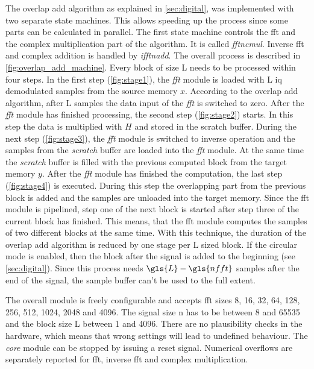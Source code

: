 \documentclass[12pt,a4paper,parskip=full,abstract=true,BCOR=12mm,twoside,open=right]{scrreprt}
\def\device#1{\mbox{\textit{#1}}}
\begin{document}
The overlap add algorithm as explained in \cref{sec:digital}, was implemented with
two separate state machines. This allows speeding up the process since some parts can be calculated in parallel.
The first state machine controls the \gls{fft} and the complex multiplication part of the
algorithm. It is called \device{fftncmul}. Inverse \gls{fft} and complex
addition is handled by \device{ifftnadd}. The overall process is described in
\cref{fig:overlap_add_machine}. Every block of size \gls{L}
needs to be processed within four steps. In the first step (\cref{fig:stage1}),
the \device{fft} module is loaded with \gls{L} \gls{iq} demodulated samples from the source memory $x$. According to
the overlap add algorithm, after \gls{L} samples the data input of the \device{fft}
is switched to zero. After the \device{fft} module has finished processing,
the second step (\cref{fig:stage2}) starts. In this step the data is multiplied
with $H$ and stored in the scratch buffer. During the next step (\cref{fig:stage3}),
the \device{fft} module is switched to inverse operation and the samples from the
\device{scratch} buffer are loaded into the \device{fft} module. At the same time
the \device{scratch} buffer is filled with the previous computed block from the target
memory $y$. After the \device{fft} module has finished the computation, the last step (\cref{fig:stage4})
is executed. During this step the overlapping part from the previous block is added and
the samples are unloaded into the target memory. Since the \gls{fft}
module is pipelined, step one of the next block is started after step three
of the current block has finished. This means, that the \gls{fft} module computes
the samples of two different blocks at the same time. With this technique, the
duration of the overlap add algorithm is reduced by one stage per \gls{L} sized block.
If the circular mode is enabled, then the block after the signal is added to the
beginning (see \cref{sec:digital}). Since this process needs $\gls{L} - \gls{nfft}$ samples
after the end of the signal, the sample buffer can't be used to the full extent.

The overall module is freely configurable and accepts \gls{fft} sizes 8, 16,
32, 64, 128, 256, 512, 1024, 2048 and 4096. The signal size \gls{n} has to be between
8 and 65535 and the block size \gls{L} between 1 and 4096. There are no plausibility
checks in the hardware, which means that wrong settings will lead to undefined
behaviour. The \device{core} module can be stopped by issuing a reset signal.
Numerical overflows are separately reported for \gls{fft}, inverse \gls{fft}
and complex multiplication.
\end{document}
